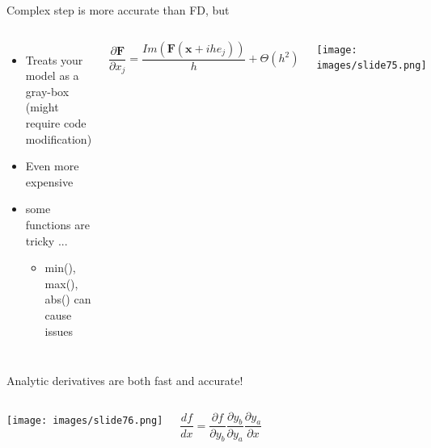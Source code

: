 \documentclass[aspectratio=169, usenames, dvipsnames, 14pt]{beamer}
\begin{document}
 \begin{frame}{Complex step is more accurate than FD, but}
     \begin{columns}
             \begin{itemize}
                 \item Treats your model as a gray-box (might require code modification)
                 \item Even more expensive
                 \item some functions are tricky ...
                     \begin{itemize}
                         \item min(), max(), abs() can cause issues
                     \end{itemize}
             \end{itemize}
 
             \vspace{-0.5cm}
 
             \begin{equation*}
                 \frac{\partial \textbf{F}}{\partial x_{j}} =\frac{Im(\textbf{F}(\textbf{x}+ihe_{j}))}{h} +\Theta (h^{2})
             \end{equation*}
 
             \texttt{[image: images/slide75.png]}
     \end{columns}
 
 \end{frame}    



 \begin{frame}{Analytic derivatives are both fast and accurate!}
 \begin{columns}
         \texttt{[image: images/slide76.png]}
 
         \vspace{2cm}
         \begin{equation*}
             \frac{df}{dx} = \frac{\partial f}{\partial y_{b}} \frac{\partial y_{b}}{\partial y_{a}} \frac{\partial y_{a}}{\partial x}
         \end{equation*}
 \end{columns}
 
 \end{frame}
\end{document}
